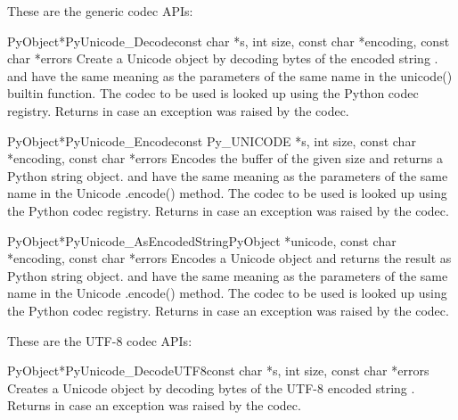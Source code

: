 \documentclass{manual}
\begin{document}
These are the generic codec APIs:

\begin{cfuncdesc}{PyObject*}{PyUnicode_Decode}{const char *s,
                                               int size,
                                               const char *encoding,
                                               const char *errors}
Create a Unicode object by decoding  bytes of the encoded
string .  and  have the same meaning
as the parameters of the same name in the unicode() builtin
function. The codec to be used is looked up using the Python codec
registry. Returns \NULL{} in case an exception was raised by the
codec.
\end{cfuncdesc}

\begin{cfuncdesc}{PyObject*}{PyUnicode_Encode}{const Py_UNICODE *s,
                                               int size,
                                               const char *encoding,
                                               const char *errors}
Encodes the  buffer of the given size and returns a
Python string object.  and  have the same
meaning as the parameters of the same name in the Unicode .encode()
method. The codec to be used is looked up using the Python codec
registry. Returns \NULL{} in case an exception was raised by the
codec.
\end{cfuncdesc}

\begin{cfuncdesc}{PyObject*}{PyUnicode_AsEncodedString}{PyObject *unicode,
                                               const char *encoding,
                                               const char *errors}
Encodes a Unicode object and returns the result as Python string
object.  and  have the same meaning as the
parameters of the same name in the Unicode .encode() method. The codec
to be used is looked up using the Python codec registry. Returns
\NULL{} in case an exception was raised by the codec.
\end{cfuncdesc}


These are the UTF-8 codec APIs:

\begin{cfuncdesc}{PyObject*}{PyUnicode_DecodeUTF8}{const char *s,
                                               int size,
                                               const char *errors}
Creates a Unicode object by decoding  bytes of the UTF-8
encoded string . Returns \NULL{} in case an exception was
raised by the codec.
\end{cfuncdesc}
\end{document}
